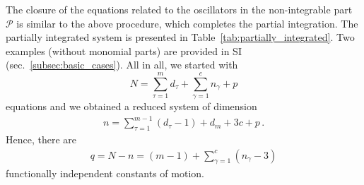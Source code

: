\documentclass[aps,pre,reprint,longbibliography,superscriptaddress,noshowpacs,floatfix]{revtex4-2}
\theoremstyle{definition}
\theoremstyle{remark}
\begin{document}
The closure of the equations related to the oscillators in the non-integrable part $\mathcal{P}$ is similar to the above procedure, which completes the partial integration. The partially integrated system is presented in Table~\ref{tab:partially_integrated}. Two examples (without monomial parts) are provided in SI (sec.~\ref{subsec:basic_cases}). All in all, we started with 
\begin{equation*}
    N = \sum_{\tau=1}^m d_{\tau} + \sum_{\gamma=1}^c n_{\gamma} + p 
\end{equation*}
equations and we obtained a reduced system of dimension
\begin{align*}
    n = \sum_{\tau=1}^{m-1} (d_{\tau} - 1) + d_m + 3c + p\,.
\end{align*} 
Hence, there are
\begin{align*}
    q = N - n = (m-1) + \sum_{\gamma=1}^c (n_{\gamma} - 3)
\end{align*}
functionally independent constants of motion. 
\end{document}
